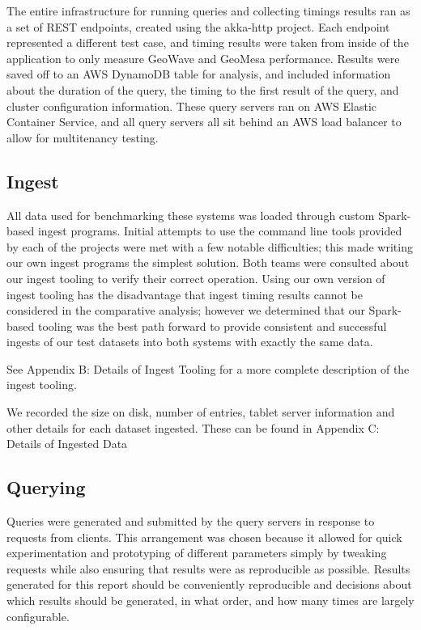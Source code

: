 The entire infrastructure for running queries and collecting timings results ran as a set of REST endpoints, created using the akka-http project.
Each endpoint represented a different test case, and timing results were taken from inside of the application to only measure GeoWave and GeoMesa performance.
Results were saved off to an AWS DynamoDB table for analysis, and included information about the duration of the query, the timing to the first result of the query, and cluster configuration information.
These query servers ran on AWS Elastic Container Service, and all query servers all sit behind an AWS load balancer to allow for multitenancy testing.


\subsection{Ingest}
\label{sec:performance:ingest}

All data used for benchmarking these systems was loaded through custom Spark-based ingest programs.
Initial attempts to use the command line tools provided by each of the projects were met with a few notable difficulties; this made writing our own ingest programs the simplest solution.
Both teams were consulted about our ingest tooling to verify their correct operation.
Using our own version of ingest tooling has the disadvantage that ingest timing results cannot be considered in the comparative analysis; however we determined that our Spark-based tooling was the best path forward to provide consistent and successful ingests of our test datasets into both systems with exactly the same data.

See Appendix B: Details of Ingest Tooling for a more complete description of the ingest tooling.

We recorded the size on disk, number of entries, tablet server information and other details for each dataset ingested.
These can be found in Appendix C: Details of Ingested Data


\subsection{Querying}
\label{sec:performance:querying}

Queries were generated and submitted by the query servers in response to requests from clients.
This arrangement was chosen because it allowed for quick experimentation and prototyping of different parameters simply by tweaking requests while also ensuring that results were as reproducible as possible. Results generated for this report should be conveniently reproducible and decisions about which results should be generated, in what order, and how many times are largely configurable.


